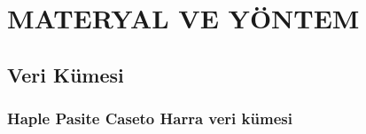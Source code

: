 \chapter{MATERYAL VE YÖNTEM}







\section{Veri Kümesi}


\subsection{Haple Pasite Caseto Harra veri kümesi}


